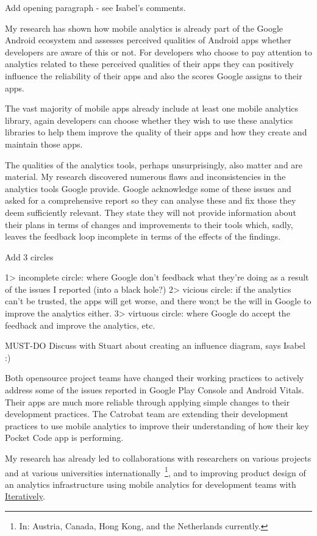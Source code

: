 Add opening paragraph - see Isabel's comments. 

My research has shown how mobile analytics is already part of the Google Android ecosystem and assesses perceived qualities 
of Android apps whether developers are aware of this or not. For developers who choose to pay attention to analytics related to these perceived qualities of their apps they can positively influence the reliability of their apps and also the scores Google assigns to their apps. 

The vast majority of mobile apps already include at least one mobile analytics library, again developers can choose whether they wish to use these analytics libraries to help them improve the quality of their apps and how they create and maintain those apps. 

The qualities of the analytics tools, perhaps unsurprisingly, also matter and are material. My research discovered numerous flaws and inconsistencies in the analytics tools Google provide. Google acknowledge some of these issues and asked for a comprehensive report so they can analyse these and fix those they deem sufficiently relevant. They state they will not provide information about their plans in terms of changes and improvements to their tools which, sadly, leaves the feedback loop incomplete in terms of the effects of the findings.

Add 3 circles 

1> incomplete circle: where Google don't feedback what they're doing as a result of the issues I reported (into a black hole?)
2> vicious circle: if the analytics can't be trusted, the apps will get worse, and there won;t be the will in Google to improve the analytics either.
3> virtuous circle: where Google do accept the feedback and improve the analytics, etc. 

MUST-DO Discuss with Stuart about creating an influence diagram, says Isabel :) 

Both opensource project teams have changed their working practices to actively address some of the issues reported in Google Play Console and Android Vitals. Their apps are much more reliable through applying simple changes to their development practices. The Catrobat team are extending their development practices to use mobile analytics to improve their understanding of how their key Pocket Code app is performing.

My research has already led to collaborations with researchers on various projects and at various universities internationally~\footnote{In: Austria, Canada, Hong Kong, and the Netherlands currently.}, and to improving product design of an analytics infrastructure using mobile analytics for development teams with \href{https://iterative.ly/}{Iteratively}. 

